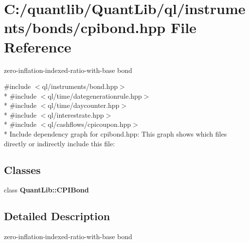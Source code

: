 \section{C\+:/quantlib/\+Quant\+Lib/ql/instruments/bonds/cpibond.hpp File Reference}
\label{cpibond_8hpp}


zero-\/inflation-\/indexed-\/ratio-\/with-\/base bond  


{\ttfamily \#include $<$ql/instruments/bond.\+hpp$>$}\\*
{\ttfamily \#include $<$ql/time/dategenerationrule.\+hpp$>$}\\*
{\ttfamily \#include $<$ql/time/daycounter.\+hpp$>$}\\*
{\ttfamily \#include $<$ql/interestrate.\+hpp$>$}\\*
{\ttfamily \#include $<$ql/cashflows/cpicoupon.\+hpp$>$}\\*
Include dependency graph for cpibond.\+hpp\+:
This graph shows which files directly or indirectly include this file\+:
\subsection*{Classes}
\begin{DoxyCompactItemize}
\item 
class {\bf Quant\+Lib\+::\+C\+P\+I\+Bond}
\end{DoxyCompactItemize}


\subsection{Detailed Description}
zero-\/inflation-\/indexed-\/ratio-\/with-\/base bond 

